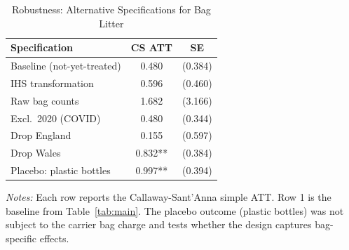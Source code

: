 \begin{table}[htbp]
\centering
\begin{threeparttable}
\caption{Robustness: Alternative Specifications for Bag Litter}
\label{tab:robust}
\begin{tabular}{lcc}
\toprule
Specification & CS ATT & SE \\
\midrule
Baseline (not-yet-treated) & 0.480 & (0.384) \\
IHS transformation & 0.596 & (0.460) \\
Raw bag counts & 1.682 & (3.166) \\
Excl.\ 2020 (COVID) & 0.480 & (0.344) \\
Drop England & 0.155 & (0.597) \\
Drop Wales & 0.832** & (0.384) \\
\midrule
Placebo: plastic bottles & 0.997** & (0.394) \\
\bottomrule
\end{tabular}
\begin{tablenotes}[flushleft]
\small
\item \textit{Notes:} Each row reports the Callaway-Sant'Anna simple ATT. Row 1 is the baseline from Table~\ref{tab:main}. The placebo outcome (plastic bottles) was not subject to the carrier bag charge and tests whether the design captures bag-specific effects.
\end{tablenotes}
\end{threeparttable}
\end{table}
